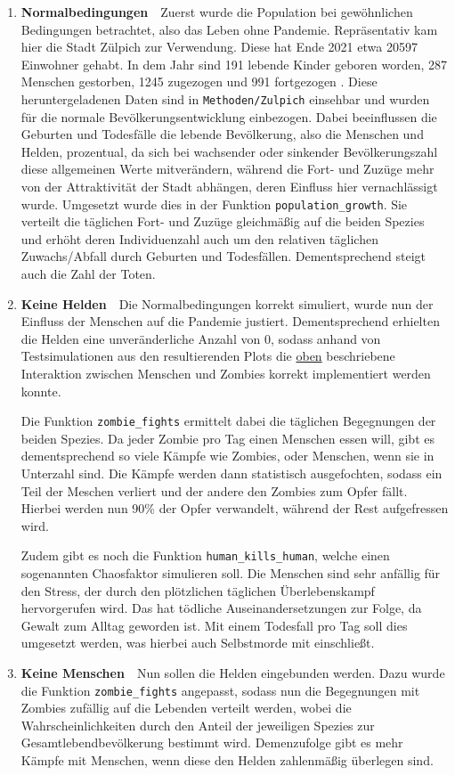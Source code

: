    \begin{enumerate}[1.]
        \item \textbf{Normalbedingungen}\ \ 
            Zuerst wurde die Population bei gewöhnlichen Bedingungen betrachtet, also das Leben ohne Pandemie. Repräsentativ kam hier die Stadt Zülpich zur Verwendung. Diese hat Ende 2021 etwa 20597 Einwohner gehabt. In dem Jahr sind 191 lebende Kinder geboren worden, 287 Menschen gestorben, 1245 zugezogen und 991 fortgezogen \cite{zulpich}. Diese heruntergeladenen Daten sind in \texttt{Methoden/Zulpich} einsehbar und wurden für die normale Bevölkerungsentwicklung einbezogen. Dabei beeinflussen die Geburten und Todesfälle die lebende Bevölkerung, also die Menschen und Helden, prozentual, da sich bei wachsender oder sinkender Bevölkerungszahl diese allgemeinen Werte mitverändern, während die Fort- und Zuzüge mehr von der Attraktivität der Stadt abhängen, deren Einfluss hier vernachlässigt wurde. Umgesetzt wurde dies in der Funktion \texttt{population\_growth}. Sie verteilt die täglichen Fort- und Zuzüge gleichmäßig auf die beiden Spezies und erhöht deren Individuenzahl auch um den relativen täglichen Zuwachs/Abfall durch Geburten und Todesfällen. Dementsprechend steigt auch die Zahl der Toten.
            \label{steps:normal}
        \item \textbf{Keine Helden}\ \ 
            Die Normalbedingungen korrekt simuliert, wurde nun der Einfluss der Menschen auf die Pandemie justiert. Dementsprechend erhielten die Helden eine unveränderliche Anzahl von 0, sodass anhand von Testsimulationen aus den resultierenden Plots die \hyperref[species]{oben} beschriebene Interaktion zwischen Menschen und Zombies korrekt implementiert werden konnte.

            Die Funktion \texttt{zombie\_fights} ermittelt dabei die täglichen Begegnungen der beiden Spezies. Da jeder Zombie pro Tag einen Menschen essen will, gibt es dementsprechend so viele Kämpfe wie Zombies, oder Menschen, wenn sie in Unterzahl sind. Die Kämpfe werden dann statistisch ausgefochten, sodass ein Teil der Meschen verliert und der andere den Zombies zum Opfer fällt. Hierbei werden nun 90\% der Opfer verwandelt, während der Rest aufgefressen wird.

            Zudem gibt es noch die Funktion \texttt{human\_kills\_human}, welche einen sogenannten Chaosfaktor simulieren soll. Die Menschen sind sehr anfällig für den Stress, der durch den plötzlichen täglichen Überlebenskampf hervorgerufen wird. Das hat tödliche Auseinandersetzungen zur Folge, da Gewalt zum Alltag geworden ist. Mit einem Todesfall pro Tag soll dies umgesetzt werden, was hierbei auch Selbstmorde mit einschließt.
            \label{steps:no_heroes}
        \item \textbf{Keine Menschen}\ \ 
            Nun sollen die Helden eingebunden werden. Dazu wurde die Funktion \texttt{zombie\_fights} angepasst, sodass nun die Begegnungen mit Zombies zufällig auf die Lebenden verteilt werden, wobei die Wahrscheinlichkeiten durch den Anteil der jeweiligen Spezies zur Gesamtlebendbevölkerung bestimmt wird. Demenzufolge gibt es mehr Kämpfe mit Menschen, wenn diese den Helden zahlenmäßig überlegen sind.


\end{enumerate}

